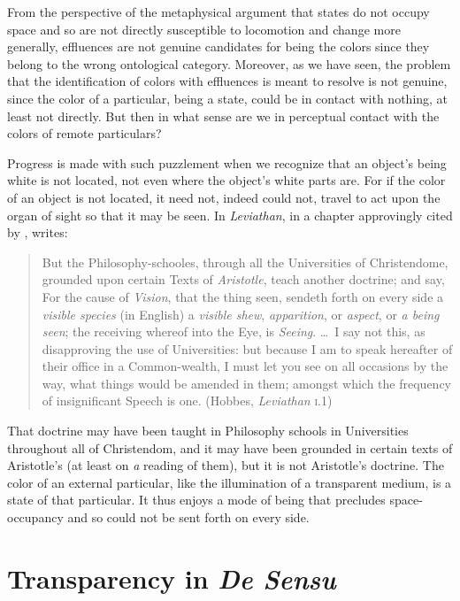 From the perspective of the metaphysical argument that states do not occupy space and so are not directly susceptible to locomotion and change more generally, effluences are not genuine candidates for being the colors since they belong to the wrong ontological category. Moreover, as we have seen, the problem that the identification of colors with effluences is meant to resolve is not genuine, since the color of a particular, being a state, could be in contact with nothing, at least not directly. But then in what sense are we in perceptual contact with the colors of remote particulars? 

Progress is made with such puzzlement when we recognize that an object's being white is not located, not even where the object's white parts are. For if the color of an object is not located, it need not, indeed could not, travel to act upon the organ of sight so that it may be seen. In \emph{Leviathan}, in a chapter approvingly cited by \citet[26 n7]{Burnyeat:1992fk}, \citet{Hobbes:1651fk} writes:
\begin{quote}
	But the Philosophy-schooles, through all the Universities of Christendome, grounded upon certain Texts of \emph{Aristotle}, teach another doctrine; and say, For the cause of \emph{Vision}, that the thing seen, sendeth forth on every side a \emph{visible species} (in English) a \emph{visible shew}, \emph{apparition}, or \emph{aspect}, or \emph{a being seen}; the receiving whereof into the Eye, is \emph{Seeing}. \ldots\ I say not this, as disapproving the use of Universities: but because I am to speak hereafter of their office in a Common-wealth, I must let you see on all occasions by the way, what things would be amended in them; amongst which the frequency of insignificant Speech is one. (Hobbes, \emph{Leviathan} \textsc{i}.1)
\end{quote}
That doctrine may have been taught in Philosophy schools in Universities throughout all of Christendom, and it may have been grounded in certain texts of Aristotle's (at least on \emph{a} reading of them), but it is not Aristotle's doctrine. The color of an external particular, like the illumination of a transparent medium, is a state of that particular. It thus enjoys a mode of being that precludes space-occupancy and so could not be sent forth on every side.


\section{Transparency in \emph{De Sensu}} %
\label{sec:transparency_in_de_sensu}

